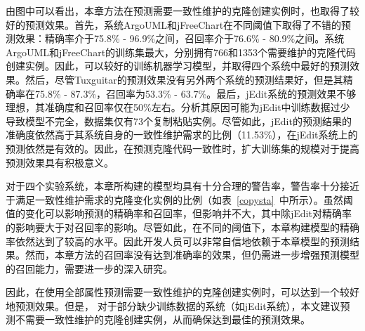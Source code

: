 由图中可以看出，本章方法在预测需要一致性维护的克隆创建实例时，也取得了较好的预测效果。首先，系统ArgoUML和jFreeChart在不同阈值下取得了不错的预测效果：精确率介于75.8\% - 96.9\%之间，召回率介于76.6\% - 80.9\%之间。系统ArgoUML和jFreeChart的训练集最大，分别拥有766和1353个需要维护的克隆代码创建实例。因此，可以较好的训练机器学习模型，并取得四个系统中最好的预测效果。然后，尽管Tuxguitar的预测效果没有另外两个系统的预测结果好，但是其精确率在75.8\% - 87.3\%，召回率为53.3\% - 63.7\%。最后，jEdit系统的预测效果不够理想，其准确度和召回率仅在50\%左右。分析其原因可能为jEdit中训练数据过少导致模型不完全，数据集仅有73个复制粘贴实例。尽管如此，jEdit的预测结果的准确度依然高于其系统自身的一致性维护需求的比例（11.53\%），在jEdit系统上的预测依然是有效的。因此，在预测克隆代码一致性时，扩大训练集的规模对于提高预测效果具有积极意义。

对于四个实验系统，本章所构建的模型均具有十分合理的警告率，警告率十分接近于满足一致性维护需求的克隆变化实例的比例（如表~\ref {copysta}~中所示）。虽然阈值的变化可以影响预测的精确率和召回率，但影响并不大，其中除jEdit对精确率的影响要大于对召回率的影响。尽管如此，在不同的阈值下，本章构建模型的精确率依然达到了较高的水平。因此开发人员可以非常自信地依赖于本章模型的预测结果。然而，本章方法的召回率没有达到准确率的效果，但仍需进一步增强预测模型的召回能力，需要进一步的深入研究。

因此，在使用全部属性预测需要一致性维护的克隆创建实例时，可以达到一个较好地预测效果。但是， 对于部分缺少训练数据的系统（如jEdit系统），本文建议预测不需要一致性维护的克隆创建实例，从而确保达到最佳的预测效果。

